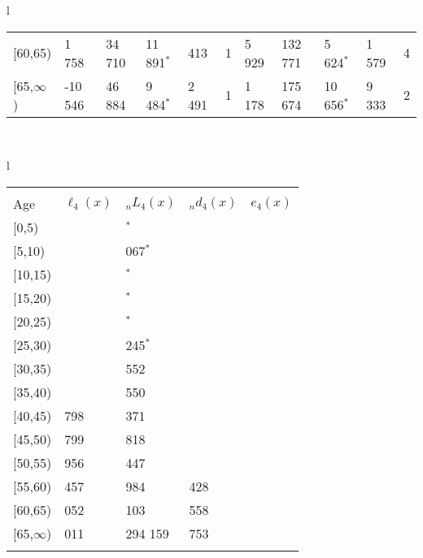 \documentclass[
]{article}
\begin{document}
\begin{table}
\begin{tabular}[t]{l}
\begin{tabular}
{}[60,65) & 1 758 & 34 710 & 11 891$^{*}$ & 413 & 1 & 5 929 & 132 771 & 5 624$^{*}$ & 1 579 & 4\\
{}[65,$\infty$) & -10 546 & 46 884 & 9 484$^{*}$ & 2 491 & 1 & 1 178 & 175 674 & 10 656$^{*}$ & 9 333 & 2\\
\end{tabular}\\
\end{tabular}
\centering
\begin{tabular}[t]{l}
\hline
\begin{tabular}{>{\raggedright\arraybackslash}p{.43in}>{\raggedleft\arraybackslash}p{1.3in}>{\raggedleft\arraybackslash}p{1.3in}>{\raggedleft\arraybackslash}p{1.3in}>{\raggedleft\arraybackslash}p{1.3in}}
\toprule
\multicolumn{1}{c}{ } & \multicolumn{4}{c}{(4) Lost both} \\
\cmidrule(l{3pt}r{3pt}){2-5}
Age & $\ell_{4}(x)$ & ${}_nL_{4}(x)$ & ${}_nd_{4}(x)$ & $e_{4}(x)$\\
\midrule
{}[0,5) & 0 & 0$^{*}$ & 0 & 19\\
{}[5,10) & 0 & 2 067$^{*}$ & 0 & 19\\
{}[10,15) & 0 & 485$^{*}$ & 0 & 19\\
{}[15,20) & 0 & 0$^{*}$ & 0 & 19\\
{}[20,25) & 0 & 0$^{*}$ & 0 & 19\\
\addlinespace
{}[25,30) & 0 & 2 245$^{*}$ & 3 & 19\\
{}[30,35) & 324 & 9 552 & 14 & 20\\
{}[35,40) & 310 & 10 550 & 19 & 20\\
{}[40,45) & 1 798 & 31 371 & 73 & 20\\
{}[45,50) & 5 799 & 53 818 & 182 & 20\\
\addlinespace
{}[50,55) & 11 956 & 117 447 & 601 & 19\\
{}[55,60) & 19 457 & 179 984 & 1 428 & 18\\
{}[60,65) & 28 052 & 215 103 & 2 558 & 17\\
{}[65,$\infty$) & 44 011 & 1 294 159 & 68 753 & 16\\
\bottomrule
\multicolumn{5}{l}{\rule{0pt}{1em}\textsuperscript{*} Based on an estimated from SIPP with less than 10 respondents in the numerator.}\\
\end{tabular}\\
\end{tabular}
\end{table}
\end{document}
